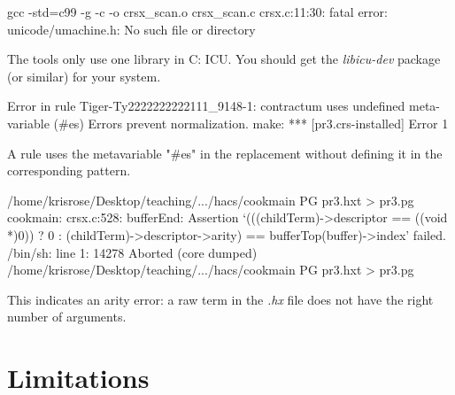 \documentclass[11pt]{article} %
\begin{document}
\begin{error}\leavevmode
\begin{code}
gcc -std=c99 -g    -c -o crsx_scan.o crsx_scan.c
crsx.c:11:30: fatal error: unicode/umachine.h: No such file or directory
\end{code}
  The \HAX tools only use one library in C: ICU. You should get the \emph{libicu-dev} package (or
  similar) for your system.
\end{error}

\begin{error}\leavevmode
\begin{code}
Error in rule Tiger-Ty2222222222111_9148-1: contractum uses undefined meta-variable (#es)
Errors prevent normalization.
make: *** [pr3.crs-installed] Error 1
\end{code}
  A rule uses the metavariable "#es" in the replacement without defining it in the corresponding
  pattern.
\end{error}

\begin{error}[]\leavevmode
\begin{code}
/home/krisrose/Desktop/teaching/.../hacs/cookmain PG pr3.hxt > pr3.pg
cookmain: crsx.c:528: bufferEnd: Assertion
   `(((childTerm)->descriptor == ((void *)0)) ? 0 :
        (childTerm)->descriptor->arity) == bufferTop(buffer)->index' failed.
/bin/sh: line 1: 14278 Aborted
  (core dumped) /home/krisrose/Desktop/teaching/.../hacs/cookmain PG pr3.hxt > pr3.pg
\end{code}
  This indicates an arity error: a raw term in the \emph{.hx} file does not have the right number of
  arguments.
\end{error}


\section{Limitations}\label{app:limits}
\end{document}
